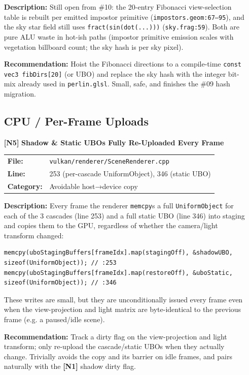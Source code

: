 \documentclass[a4paper,12pt]{article}
\newcommand{\severitybox}[2]{%
  \colorbox{#1}{\makebox[2.5cm][c]{\textcolor{white}{\textbf{#2}}}}%
}
\begin{document}
\begin{enumerate}[leftmargin=*]
  \textbf{Description:}
  Still open from \#10: the 20-entry Fibonacci view-selection table is rebuilt
  per emitted impostor primitive (\texttt{impostors.geom:67--95}), and the sky
  star field still uses \texttt{fract(sin(dot(...)))} (\texttt{sky.frag:59}). Both
  are pure ALU waste in hot-ish paths (impostor primitive emission scales with
  vegetation billboard count; the sky hash is per sky pixel).

  \textbf{Recommendation:}
  Hoist the Fibonacci directions to a compile-time \texttt{const vec3 fibDirs[20]}
  (or UBO) and replace the sky hash with the integer bit-mix already used in
  \texttt{perlin.glsl}. Small, safe, and finishes the \#09 hash migration.

\subsection{CPU / Per-Frame Uploads}

\item[\textbf{[N5]}] \textbf{Shadow \& Static UBOs Fully Re-Uploaded Every Frame}
  \hfill \severitybox{lowcolor}{LOW}

  \begin{tabular}{ll}
    \textbf{File:} & \texttt{vulkan/renderer/SceneRenderer.cpp} \\
    \textbf{Line:} & 253 (per-cascade UniformObject), 346 (static UBO) \\
    \textbf{Category:} & Avoidable host→device copy \\
  \end{tabular}

  \textbf{Description:}
  Every frame the renderer \texttt{memcpy}s a full \texttt{UniformObject} for
  each of the 3 cascades (line 253) and a full static UBO (line 346) into staging
  and copies them to the GPU, regardless of whether the camera/light transform
  changed:

\begin{lstlisting}
memcpy(uboStagingBuffers[frameIdx].map(stagingOff), &shadowUBO, sizeof(UniformObject)); // :253
memcpy(uboStagingBuffers[frameIdx].map(restoreOff), &uboStatic, sizeof(UniformObject)); // :346
\end{lstlisting}

  These writes are small, but they are unconditionally issued every frame even
  when the view-projection and light matrix are byte-identical to the previous
  frame (e.g. a paused/idle scene).

  \textbf{Recommendation:}
  Track a dirty flag on the view-projection and light transform; only re-upload
  the cascade/static UBOs when they actually change. Trivially avoids the copy
  and its barrier on idle frames, and pairs naturally with the \textbf{[N1]}
  shadow dirty flag.

\end{enumerate}
\end{document}
